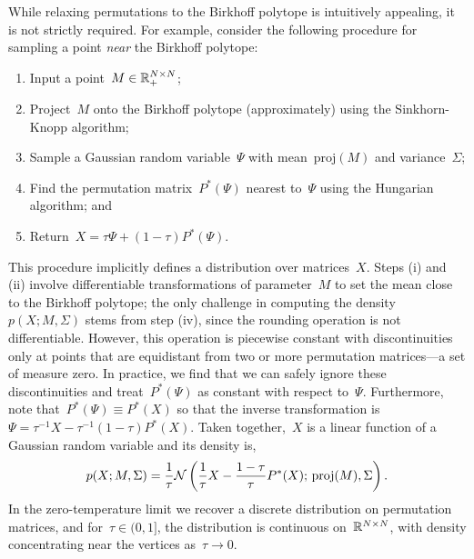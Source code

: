 \documentclass[twoside]{article}
\begin{document}
While relaxing permutations to the Birkhoff polytope is intuitively
appealing, it is not strictly required.  For example, consider the
following procedure for sampling a point \emph{near} the Birkhoff
polytope:
\begin{enumerate}[label=(\roman*)]
\item Input a point~${M \in \mathbb{R}_+^{N \times N}}$;
\item Project~$M$ onto the Birkhoff polytope (approximately) using the Sinkhorn-Knopp algorithm;
\item Sample a Gaussian random variable~$\Psi$ with mean~$\mathrm{proj}(M)$ and variance~$\Sigma$;
\item Find the permutation matrix~${P^*(\Psi)}$ nearest to~$\Psi$ using the Hungarian algorithm;
  and
\item Return~${X = \tau \Psi + (1-\tau) P^*(\Psi)}$.
\end{enumerate}
This procedure implicitly defines a distribution over matrices~$X$.
Steps (i) and (ii) involve differentiable transformations of
parameter~$M$ to set the mean close to the Birkhoff polytope; the only
challenge in computing the density~$p(X; M, \Sigma)$ stems from step
(iv), since the rounding operation is not differentiable.  However,
this operation is piecewise constant with discontinuities only at
points that are equidistant from two or more permutation matrices---a
set of measure zero.  In practice, we find that we can safely ignore
these discontinuities and treat~$P^*(\Psi)$ as constant
with respect to~$\Psi$.  Furthermore, note that~${P^*(\Psi) \equiv P^*(X)}$
so that the inverse transformation is~${\Psi = \tau^{-1}X - \tau^{-1}(1-\tau) P^*(X)}$.  Taken together,~$X$ is a linear function of a
Gaussian random variable and its density is,
\begin{align*}
  p(X; M, \Sigma) = \frac{1}{\tau} \mathcal{N} \left( \frac{1}{\tau}X -\frac{1-\tau}{\tau} P^*(X); \, \mathrm{proj}(M), \Sigma \right).
\end{align*}
In the zero-temperature limit we recover a discrete distribution on
permutation matrices, and for~$\tau \in (0,1]$, the distribution is
continuous on~$\mathbb{R}^{N \times N}$, with density concentrating near
the vertices as~${\tau \to 0}$.
\end{document}
